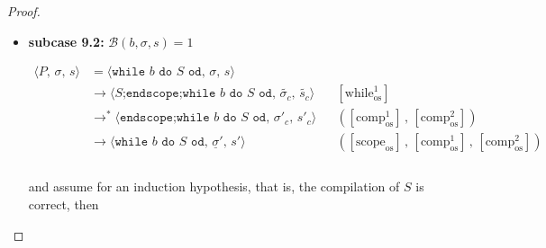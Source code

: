 \documentclass{article}
\begin{document}
\begin{proof}
\begin{itemize}
\begin{itemize}
          \item \textbf{subcase 9.2:} $\mathcal{B}(b, \sigma, s) = 1$

          \[
              \begin{aligned}
              \langle P,\, \sigma,\, s \rangle
              &=\langle \texttt{while } b \texttt{ do } S \texttt{ od},\, \sigma,\, s \rangle \\
              &\rightarrow \langle S\texttt{;endscope} \texttt{;while } b \texttt{ do } S \texttt{ od},\, \tilde{\sigma_c},\, \tilde{s_c} \rangle
              && [\text{while}^1_{\text{os}}]   \\
              &\rightarrow^\ast \langle \texttt{endscope} \texttt{;while } b \texttt{ do } S \texttt{ od},\, \sigma'_c,\, s'_c \rangle
              && ([\text{comp}^1_{\text{os}}] \,,\, [\text{comp}^2_{\text{os}}])   \\
              &\rightarrow \langle \texttt{while } b \texttt{ do } S \texttt{ od},\, \underline{\sigma}',\, s' \rangle
              && ([\text{scope}_{\text{os}}] \,,\, [\text{comp}^1_{\text{os}}] \,,\, [\text{comp}^2_{\text{os}}])   \\
              &&    \\
              \end{aligned}
          \]

          and assume for an induction hypothesis, that is, the compilation of $S$ is correct, then


\end{itemize}
\end{itemize}
\end{proof}
\end{document}
